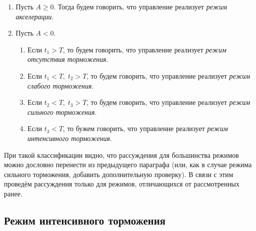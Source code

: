 \begin{enumerate}
        \item Пусть $A \geqslant 0$. Тогда будем говорить, что управление реализует \textit{режим акселерации}.
        \item Пусть $A < 0$.
        \begin{enumerate}
                \item Если $t_1 > T$, то будем говорить, что управление реализует \textit{режим отсутствия торможения}.
                \item Если $t_1 < T, \; t_2 > T$, то будем говорить, что управление реализует \textit{режим слабого торможения}.
                \item Если $t_2 < T, \; t_3 > T$, то будем говорить, что управление реализует \textit{режим сильного торможения}.
                \item Если $t_3 < T$, то бужем говорить, что управление реализует \textit{режим интенсивного торможения}.
        \end{enumerate}
\end{enumerate}
При такой классификации видно, что рассуждения для большинства режимов можно дословно перенести из предыдущего параграфа (или, как в случае режима сильного торможения, добавить дополнительную проверку). В связи с этим проведём рассуждения только для режимов, отличающихся от рассмотренных ранее.

\subsection{Режим интенсивного торможения}


